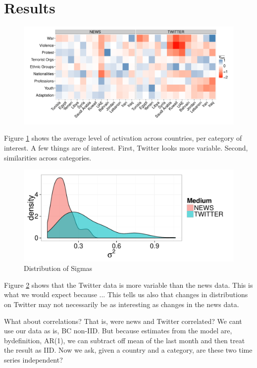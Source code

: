 \section{Results}


\begin{figure}
	\centering
	\includegraphics[width=\textwidth]{imgs/activity_topics}

	\caption{}
	\label{fig:overall}
\end{figure}

Figure \ref{fig:overall} shows the average level of activation across countries, per category of interest.  A few things are of interest.  First, Twitter looks more variable.  Second, similarities across categories. 

\begin{figure}
	\centering
	\includegraphics[width=.7\textwidth]{imgs/diff_sigma}

	\caption{Distribution of Sigmas}
	\label{fig:sig}
\end{figure}

Figure \ref{fig:sig} shows that the Twitter data is more variable than the news data. This is what we would expect because ...  This tells us also that changes in distributions on Twitter may not necessarily be as interesting as changes in the news data.

What about correlations?  That is, were news and Twitter correlated?  We cant use our data as is, BC non-IID.  But because estimates from the model are, bydefinition, AR(1), we can subtract off mean of the last month and then treat the result as IID.  Now we ask, given a country and a category, are these two time series independent? 


